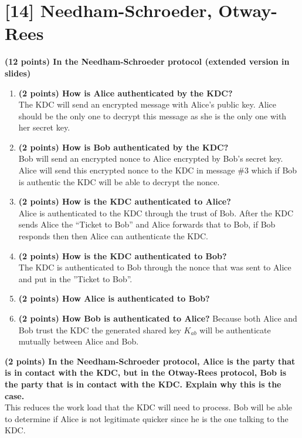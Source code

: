 \documentclass[letterpaper,11pt,notitlepage,fleqn]{article}
\begin{document}
\section{[14] Needham-Schroeder, Otway-Rees}
\noindent\textbf{(12 points) In the Needham-Schroeder protocol (extended version in slides)}
\begin{enumerate}[label=\roman*]
    \item\textbf{(2 points) How is Alice authenticated by the KDC?} \\
        The KDC will send an encrypted message with Alice's public key. Alice should be the only one to decrypt this message as she is the only one with her secret key. 
    \item\textbf{(2 points) How is Bob authenticated by the KDC?} \\
        Bob will send an encrypted nonce to Alice encrypted by Bob's secret key. Alice will send this encrypted nonce to the KDC in message \#3 which if Bob is authentic the KDC will be able to decrypt the nonce. 
    \item\textbf{(2 points) How is the KDC authenticated to Alice?} \\
        Alice is authenticated to the KDC through the trust of Bob. After the KDC sends Alice the ``Ticket to Bob'' and Alice forwards that to Bob, if Bob responds then then Alice can authenticate the KDC.
    \item\textbf{(2 points) How is the KDC authenticated to Bob?} \\
        The KDC is authenticated to Bob through the nonce that was sent to Alice and put in the ''Ticket to Bob''.
    \item\textbf{(2 points) How Alice is authenticated to Bob?} \\
    \item\textbf{(2 points) How Bob is authenticated to Alice?}
        Because both Alice and Bob trust the KDC the generated shared key $K_{ab}$ will be authenticate mutually between Alice and Bob.
\end{enumerate}

\noindent\textbf{(2 points) In the Needham-Schroeder protocol, Alice is the party that is in contact with the KDC, but in the Otway-Rees protocol, Bob is the party that is in contact with the KDC. Explain why this is the case.} \\
This reduces the work load that the KDC will need to process. Bob will be able to determine if Alice is not legitimate quicker since he is the one talking to the KDC.
\end{document}
